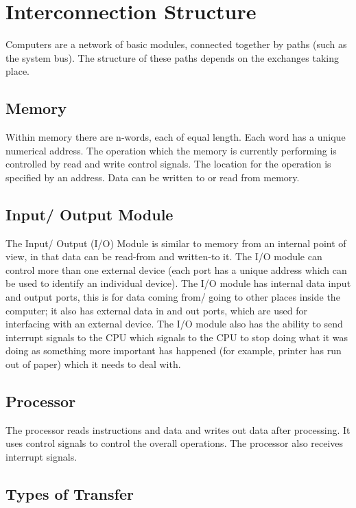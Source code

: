 
\section*{Interconnection Structure}
Computers are a network of basic modules, connected together by paths (such as the system bus). The structure of these paths depends on the exchanges taking place.

\subsection*{Memory}
Within memory there are n-words, each of equal length. Each word has a unique numerical address. The operation which the memory is currently performing is controlled by read and write control signals. The location for the operation is specified by an address. Data can be written to or read from memory.

\subsection*{Input/ Output Module}
The Input/ Output (I/O) Module is similar to memory from an internal point of view, in that data can be read-from and written-to it. The I/O module can control more than one external device (each port has a unique address which can be used to identify an individual device). The I/O module has internal data input and output ports, this is for data coming from/ going to other places inside the computer; it also has external data in and out ports, which are used for interfacing with an external device. The I/O module also has the ability to send interrupt signals to the CPU which signals to the CPU to stop doing what it was doing as something more important has happened (for example, printer has run out of paper) which it needs to deal with.

\subsection*{Processor}
The processor reads instructions and data and writes out data after processing. It uses control signals to control the overall operations. The processor also receives interrupt signals.

\subsection*{Types of Transfer}

